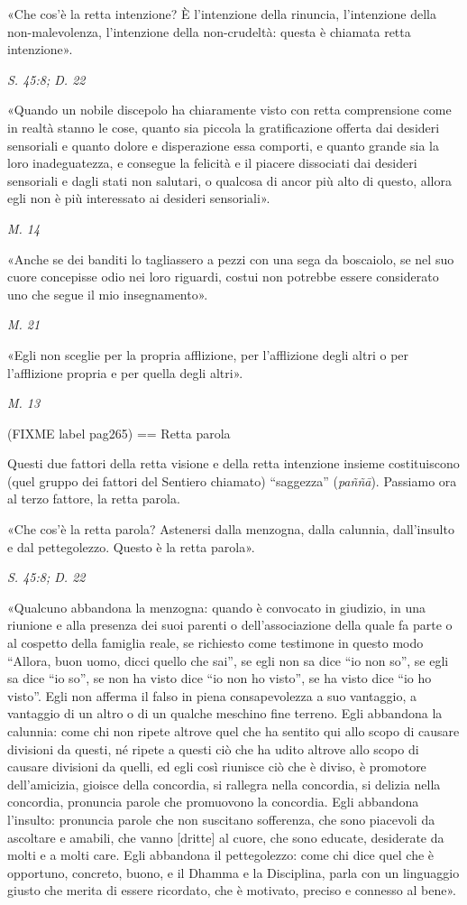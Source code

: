  «Che cos’è la retta intenzione? È l’intenzione della
rinuncia, l’intenzione della non-malevolenza, l’intenzione della
non-crudeltà: questa è chiamata retta intenzione».


\emph{S. 45:8; D. 22}


«Quando un nobile discepolo ha chiaramente visto con retta comprensione
come in realtà stanno le cose, quanto sia piccola la gratificazione
offerta dai desideri sensoriali e quanto dolore e disperazione essa
comporti, e quanto grande sia la loro inadeguatezza, e consegue la
felicità e il piacere dissociati dai desideri sensoriali e dagli stati
non salutari, o qualcosa di ancor più alto di questo, allora egli non è
più interessato ai desideri sensoriali».


\emph{M. 14}


«Anche se dei banditi lo tagliassero a pezzi con una sega da boscaiolo,
se nel suo cuore concepisse odio nei loro riguardi, costui non potrebbe
essere considerato uno che segue il mio insegnamento».


\emph{M. 21}


«Egli non sceglie per la propria afflizione, per l’afflizione degli
altri o per l’afflizione propria e per quella degli altri».


\emph{M. 13}


(FIXME label pag265)
== Retta parola


 Questi due fattori della retta visione e della retta
intenzione insieme costituiscono (quel gruppo dei fattori del Sentiero
chiamato) “saggezza” (\emph{paññā}). Passiamo ora al terzo fattore, la retta
parola.


 «Che cos’è la retta parola? Astenersi dalla menzogna, dalla
calunnia, dall’insulto e dal pettegolezzo. Questo è la retta parola».


\emph{S. 45:8; D. 22}


«Qualcuno abbandona la menzogna: quando è convocato in giudizio, in una
riunione e alla presenza dei suoi parenti o dell’associazione della
quale fa parte o al cospetto della famiglia reale, se richiesto come
testimone in questo modo “Allora, buon uomo, dicci quello che sai”, se
egli non sa dice “io non so”, se egli sa dice “io so”, se non ha visto
dice “io non ho visto”, se ha visto dice “io ho visto”. Egli non afferma
il falso in piena consapevolezza a suo vantaggio, a vantaggio di un
altro o di un qualche meschino fine terreno. Egli abbandona la calunnia:
come chi non ripete altrove quel che ha sentito qui allo scopo di
causare divisioni da questi, né ripete a questi ciò che ha udito altrove
allo scopo di causare divisioni da quelli, ed egli così riunisce ciò che
è diviso, è promotore dell’amicizia, gioisce della concordia, si
rallegra nella concordia, si delizia nella concordia, pronuncia parole
che promuovono la concordia. Egli abbandona l’insulto: pronuncia parole
che non suscitano sofferenza, che sono piacevoli da ascoltare e amabili,
che vanno [dritte] al cuore, che sono educate, desiderate da molti e a
molti care. Egli abbandona il pettegolezzo: come chi dice quel che è
opportuno, concreto, buono, e il Dhamma e la Disciplina, parla con un
linguaggio giusto che merita di essere ricordato, che è motivato,
preciso e connesso al bene».



